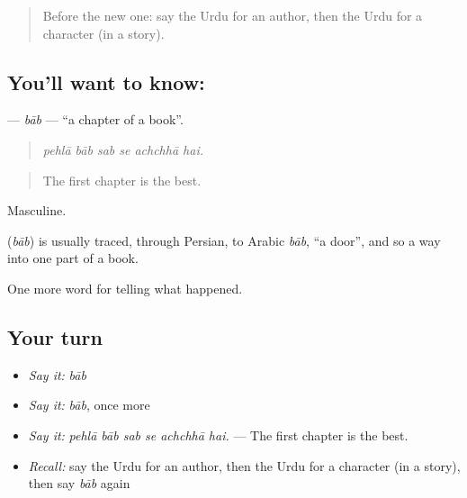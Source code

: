 \label{lesson:UR-C329-bab}



\begin{quote}
Before the new one: say the Urdu for an author, then the Urdu for a character (in a story).
\end{quote}

\subsection*{You'll want to know: }
\textbf{} — \emph{bāb} — \textquotedblleft{}a chapter of a book\textquotedblright{}.

\begin{quote}
     
\end{quote}

\begin{quote}
\emph{pehlā bāb sab se achchhā hai.}
\end{quote}

\begin{quote}
The first chapter is the best.
\end{quote}

Masculine.

\begin{cousinweb}
\textbf{} (\emph{bāb}) is usually traced, through Persian, to Arabic \emph{bāb}, \textquotedblleft{}a door\textquotedblright{}, and so a way into one part of a book.
\end{cousinweb}

\begin{grammarlens}[title={What you've built}]
One more word for telling what happened.
\end{grammarlens}

\subsection*{Your turn}
\begin{itemize}
\raggedright
  \item \emph{Say it:} \emph{bāb}
  \item \emph{Say it:} \emph{bāb}, once more
  \item \emph{Say it:} \emph{pehlā bāb sab se achchhā hai.} — The first chapter is the best.
  \item \emph{Recall:} say the Urdu for an author, then the Urdu for a character (in a story), then say \emph{bāb} again
\end{itemize}

